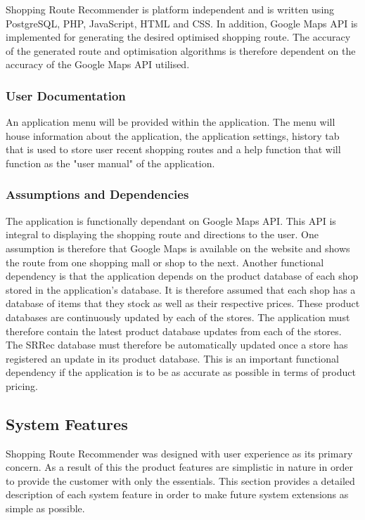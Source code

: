 \documentclass[10pt,twocolumn]{witseiepaper}
\begin{document}
			Shopping Route Recommender is platform independent and is written using PostgreSQL, PHP, JavaScript, HTML and CSS. In addition, Google Maps API is implemented for generating the desired optimised shopping route. The accuracy of the generated route and optimisation algorithms is therefore dependent on the accuracy of the Google Maps API utilised. 
		
		\subsubsection{User Documentation}
		
			An application menu will be provided within the application. The menu will house information about the application, the application settings, history tab that is used to store user recent shopping routes and a help function that will function as the "user manual" of the application. 
		
		\subsubsection{Assumptions and Dependencies}
		
			The application is functionally dependant on Google Maps API. This API is integral to displaying the shopping route and directions to the user. One assumption is therefore that Google Maps is available on the website and shows the route from one shopping mall or shop to the next. Another functional dependency is that the application depends on the product database of each shop stored in the application's database. It is therefore assumed that each shop has a database of items that they stock as well as their respective prices. These product databases are continuously updated by each of the stores. The application must therefore contain the latest product database updates from each of the stores. The SRRec database must therefore be automatically updated once a store has registered an update in its product database. This is an important functional dependency if the application is to be as accurate as possible in terms of product pricing. 
		
	\subsection{System Features}
		
		Shopping Route Recommender was designed with user experience as its primary concern. As a result of this the product features are simplistic in nature in order to provide the customer with only the essentials.	This section provides a detailed description of each system feature in order to make future system extensions as simple as possible. 
		
\end{document}
